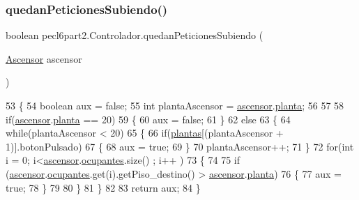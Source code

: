 \subsubsection{\texorpdfstring{quedan\+Peticiones\+Subiendo()}{quedanPeticionesSubiendo()}}
{\footnotesize\ttfamily boolean pecl6part2.\+Controlador.\+quedan\+Peticiones\+Subiendo (\begin{DoxyParamCaption}\item[{\mbox{\hyperlink{classpecl6part2_1_1_ascensor}{Ascensor}}}]{ascensor }\end{DoxyParamCaption})\hspace{0.3cm}{\ttfamily [inline]}}


\begin{DoxyCode}
53     \{
54         \textcolor{keywordtype}{boolean} aux = \textcolor{keyword}{false};
55         \textcolor{keywordtype}{int} plantaAscensor = \mbox{\hyperlink{classpecl6part2_1_1_controlador_ac2f7c4abd5447ea5daeeb7d62bf3f591}{ascensor}}.\mbox{\hyperlink{classpecl6part2_1_1_ascensor_a66017643cc6554b17d447867a0c0d619}{planta}};
56         
57         
58         \textcolor{keywordflow}{if}(\mbox{\hyperlink{classpecl6part2_1_1_controlador_ac2f7c4abd5447ea5daeeb7d62bf3f591}{ascensor}}.\mbox{\hyperlink{classpecl6part2_1_1_ascensor_a66017643cc6554b17d447867a0c0d619}{planta}} == 20)
59         \{
60             aux = \textcolor{keyword}{false};
61         \}
62         \textcolor{keywordflow}{else}
63         \{
64             \textcolor{keywordflow}{while}(plantaAscensor < 20)
65             \{
66                 \textcolor{keywordflow}{if}(\mbox{\hyperlink{classpecl6part2_1_1_controlador_a7706d274fde82fed01a03a619fbcd77c}{plantas}}[(plantaAscensor + 1)].botonPulsado)
67                 \{
68                     aux = \textcolor{keyword}{true};
69                 \}
70                 plantaAscensor++;
71             \}
72             \textcolor{keywordflow}{for}(\textcolor{keywordtype}{int} i = 0; i<\mbox{\hyperlink{classpecl6part2_1_1_controlador_ac2f7c4abd5447ea5daeeb7d62bf3f591}{ascensor}}.\mbox{\hyperlink{classpecl6part2_1_1_ascensor_af4dd01a24c9588e94061d4e61045563a}{ocupantes}}.size() ; i++ )
73             \{
74                 
75                     \textcolor{keywordflow}{if} (\mbox{\hyperlink{classpecl6part2_1_1_controlador_ac2f7c4abd5447ea5daeeb7d62bf3f591}{ascensor}}.\mbox{\hyperlink{classpecl6part2_1_1_ascensor_af4dd01a24c9588e94061d4e61045563a}{ocupantes}}.get(i).getPiso\_destino() > 
      \mbox{\hyperlink{classpecl6part2_1_1_controlador_ac2f7c4abd5447ea5daeeb7d62bf3f591}{ascensor}}.\mbox{\hyperlink{classpecl6part2_1_1_ascensor_a66017643cc6554b17d447867a0c0d619}{planta}})
76                     \{
77                         aux = \textcolor{keyword}{true};
78                     \}
79                 
80             \}
81         \}
82         
83         \textcolor{keywordflow}{return} aux;
84     \}
\end{DoxyCode}
\mbox{\label{classpecl6part2_1_1_controlador_a82ec0f1c651211c44a58dc437827b703}} 
